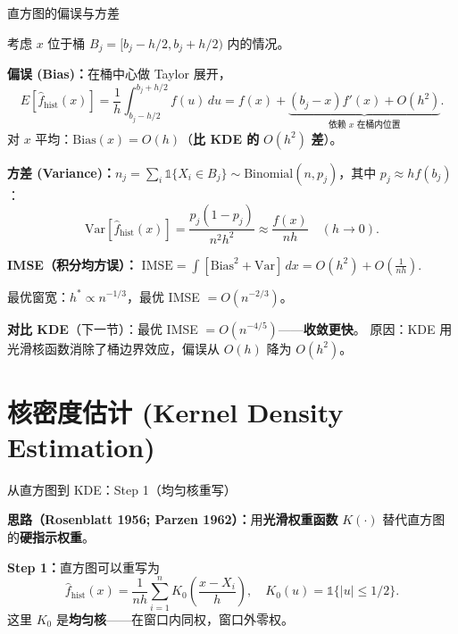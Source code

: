 \documentclass[aspectratio=169, 10pt]{beamer}
\begin{document}
\begin{frame}{直方图的偏误与方差}

  考虑 $x$ 位于桶 $B_j = [b_j - h/2, b_j + h/2)$ 内的情况。

  \textbf{偏误 (Bias)：}在桶中心做 Taylor 展开，
  \[
    E[\hat f_{\text{hist}}(x)] = \frac{1}{h}\int_{b_j-h/2}^{b_j+h/2} f(u)\, du
    = f(x) + \underbrace{(b_j - x) f'(x) + O(h^2)}_{\text{依赖 }x\text{ 在桶内位置}}.
  \]
  对 $x$ 平均：$\text{Bias}(x) = O(h)$（\textbf{比 KDE 的 }$O(h^2)$\textbf{ 差}）。

  \vspace{0.3em}

  \textbf{方差 (Variance)：}$n_j = \sum_i \mathds{1}\{X_i\in B_j\} \sim \text{Binomial}(n, p_j)$，其中 $p_j \approx h f(b_j)$：
  \[
    \text{Var}[\hat f_{\text{hist}}(x)] = \frac{p_j(1-p_j)}{n^2 h^2} \approx \frac{f(x)}{nh} \quad (h\to 0).
  \]

  \begin{highlightbox}
    \textbf{IMSE（积分均方误）：} $\text{IMSE} = \int[\text{Bias}^2 + \text{Var}]\, dx = O(h^2) + O\!\left(\frac{1}{nh}\right)$.

    \vspace{0.2em}
    最优窗宽：$h^* \propto n^{-1/3}$，最优 IMSE $= O(n^{-2/3})$。

    \vspace{0.3em}
    \textbf{对比 KDE}（下一节）：最优 IMSE $= O(n^{-4/5})$——\textbf{收敛更快}。
    原因：KDE 用光滑核函数消除了桶边界效应，偏误从 $O(h)$ 降为 $O(h^2)$。
  \end{highlightbox}

\end{frame}


\section{核密度估计 (Kernel Density Estimation)}

\begin{frame}{从直方图到 KDE：Step 1（均匀核重写）}

  \begin{keybox}
    \textbf{思路（Rosenblatt 1956; Parzen 1962）：}用\textbf{光滑权重函数} $K(\cdot)$ 替代直方图的\textbf{硬指示权重}。
  \end{keybox}

  \textbf{Step 1：}直方图可以重写为
  \[
    \hat f_{\text{hist}}(x) = \frac{1}{nh}\sum_{i=1}^n K_0\!\left(\frac{x-X_i}{h}\right),
    \quad K_0(u) = \mathds{1}\{|u|\leq 1/2\}.
  \]
  这里 $K_0$ 是\textbf{均匀核}——在窗口内同权，窗口外零权。

\end{frame}
\end{document}
